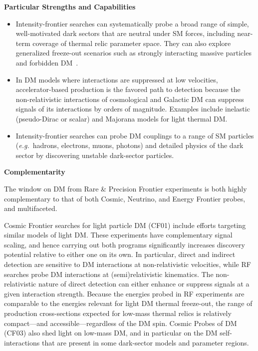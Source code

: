 \documentclass[nofootinbib]{article}
\begin{document}
\vspace{1em}
\noindent \textbf{Particular Strengths and Capabilities} 

\begin{itemize}[leftmargin=1.0em]
    \item Intensity-frontier searches can systematically probe a broad range of simple, well-motivated dark sectors that are neutral under SM forces, including near-term coverage of thermal relic parameter space.  They can also explore generalized freeze-out scenarios such as strongly interacting massive particles and forbidden DM~\cite{Asadi:2022njl}. 
    \item In DM models where interactions are suppressed at low velocities, accelerator-based production is the favored path to detection because the non-relativistic interactions of cosmological and Galactic DM can suppress signals of its interactions by orders of magnitude.  Examples include inelastic (pseudo-Dirac or scalar) and Majorana models for light thermal DM.
   \item Intensity-frontier searches can probe DM couplings to a range of SM particles ({\em e.g.}\ hadrons, electrons, muons, photons) and detailed physics of the dark sector by discovering unstable dark-sector particles.
   \end{itemize}

\vspace{1em}
\noindent \textbf{Complementarity} 

The window on DM from Rare \& Precision Frontier experiments is both highly complementary to that of both Cosmic, Neutrino, and Energy Frontier probes, and multifaceted. 

Cosmic Frontier searches for light particle DM (CF01) include efforts targeting similar models of light DM. These experiments have complementary signal scaling, and hence carrying out both programs significantly increases discovery potential relative to either one on its own. In particular, direct and indirect detection are sensitive to DM interactions at non-relativistic velocities, while RF searches probe DM interactions at (semi)relativistic kinematics. The non-relativistic nature of direct detection can either enhance or suppress signals at a given interaction strength. Because the energies probed in RF experiments are comparable to the energies relevant for light DM thermal freeze-out, the range of production cross-sections expected for low-mass thermal relics is relatively compact---and accessible---regardless of the DM spin.  
Cosmic Probes of DM (CF03) also shed light on low-mass DM, and in particular on the DM self-interactions that are present in some dark-sector models and parameter regions.  
\end{document}
